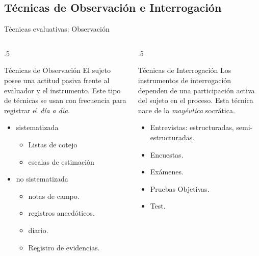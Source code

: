 \documentclass[11pt, aspectratio=169, xcolor=table,hyphens]{beamer}
\begin{document}
\subsection{Técnicas de Observación e Interrogación}
\begin{frame}{Técnicas evaluativas: Observación}
	\begin{columns}
		\begin{column}{.5\linewidth}
			\begin{block}{Técnicas de Observación}
				El sujeto posee una actitud pasiva frente al evaluador y el instrumento. Este tipo de técnicas se usan con frecuencia para registrar el \textit{día a día}.
				\begin{itemize}
					\item sistematizada
					      \begin{itemize}
						      \item Listas de cotejo
						      \item<2-> escalas de estimación
					      \end{itemize}
					\item no sistematizada
					      \begin{itemize}
						      \item<3-> notas de campo.
						      \item<4-> registros anecdóticos.
						      \item<5-> diario.
						      \item<6-> Registro de evidencias.
					      \end{itemize}
				\end{itemize}
			\end{block}
		\end{column}
		\begin{column}{.5\linewidth}
			\begin{block}{Técnicas de Interrogación}
				\justifying
				Los instrumentos de interrogación dependen de una participación activa del sujeto en el proceso. Esta técnica nace de la \textit{mayéutica} socrática.
				\begin{itemize}
					\item<7-> Entrevistas: estructuradas, semi-estructuradas.
					\item<8-> Encuestas.
					\item<9-> Exámenes.
					\item<10-> Pruebas Objetivas.
					\item<11-> Test.
				\end{itemize}
			\end{block}
		\end{column}
	\end{columns}
\end{frame}
\end{document}
